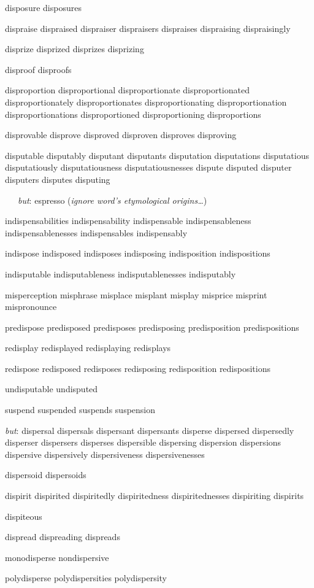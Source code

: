 \begin{itemize}
disposure disposures

dispraise dispraised dispraiser dispraisers dispraises dispraising dispraisingly

disprize disprized disprizes disprizing

disproof disproofs

disproportion disproportional disproportionate disproportionated disproportionately disproportionates disproportionating disproportionation disproportionations disproportioned disproportioning disproportions

disprovable disprove disproved disproven disproves disproving

disputable disputably disputant disputants disputation disputations disputatious disputatiously disputatiousness disputatiousnesses dispute disputed disputer disputers disputes disputing

\ \ \ \emph{but}: espresso (\emph{ignore word's etymological origins\dots})

indispensabilities indispensability indispensable indispensableness indispensablenesses indispensables indispensably

indispose indisposed indisposes indisposing indisposition indispositions

indisputable indisputableness indisputablenesses indisputably

misperception misphrase misplace misplant misplay misprice misprint mispronounce 

predispose predisposed predisposes predisposing predisposition predispositions

redisplay redisplayed redisplaying redisplays

redispose redisposed redisposes redisposing redisposition redispositions

undisputable undisputed

suspend suspended suspends suspension

\emph{but}: dispersal dispersals dispersant dispersants disperse dispersed dispersedly disperser dispersers disperses dispersible dispersing dispersion dispersions dispersive dispersively dispersiveness dispersivenesses

dispersoid dispersoids

dispirit dispirited dispiritedly dispiritedness dispiritednesses dispiriting dispirits

dispiteous

dispread dispreading dispreads

monodisperse nondispersive

polydisperse polydispersities polydispersity

\end{itemize}



